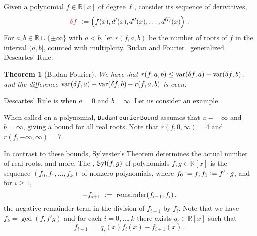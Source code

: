 \documentclass[12pt]{amsart}
\newtheorem{theorem}{Theorem}
\theoremstyle{definition}
\newcommand{\RR}{\mathbb{R}}
\DeclareMathOperator{\var}{{\rm var}}
\DeclareMathOperator{\Syl}{{\rm Syl}}
\newcommand{\defcolor}[1]{{\color{Maroon}#1}}
\newcommand{\demph}[1]{\defcolor{{\sl #1}}}
\begin{document}
Given a polynomial $f\in\RR[x]$ of degree $\ell$, consider its sequence of derivatives,
%
 \[
   \defcolor{\delta f}\ \vcentcolon= \left(f(x),d'(x),d''(x),\dots,d^{(l)}(x)\right)\,.
 \]
%
For $a,b\in \RR\cup\{\pm \infty\}$ with $a<b$, let \defcolor{$r(f,a,b)$} be the number of roots of $f$ in the interval $(a,b]$, counted
with multiplcity.
Budan and Fourier~\cite[Ch.\ 2]{So_Book} generalized Descartes' Rule.

\begin{theorem}[Budan-Fourier]
  We have that $r(f,a,b)\leq \var(\delta f,a) -\var(\delta f,b)$, and the difference
  $\var(\delta f,a) -\var(\delta f,b)-r(f,a,b)$ is even. 
\end{theorem}

Descartes' Rule is when $a=0$ and $b=\infty$.
Let us consider an example.
%
\begin{leftbar}

\end{leftbar}
%
When called on a polynomial, \texttt{BudanFourierBound} assumes that $a=-\infty$ and $b=\infty$, giving a bound for all real roots.
Note that $r(f,0,\infty)=4$ and $r(f,-\infty,\infty)=7$.

In contrast to these bounds, 
Sylvester's Theorem determines the actual number of real roots, and more.
The \demph{Sylvester sequence}, \defcolor{$\Syl(f,g)$} of polynomials $f,g\in\RR[x]$ is the sequence
$\left(f_0,f_1,\dotsc,f_k\right)$ of nonzero polynomials, where $f_0\vcentcolon= f, f_1 \vcentcolon= f'\cdot g$,
and for $i\geq 1$, 
%
  \[
    -f_{i+1}\ \vcentcolon=\ \mbox{remainder}(f_{i-1},f_i)\,,
  \]
%
the negative remainder term in the division of $f_{i-1}$ by $f_i$.
Note that we have $f_k = \gcd(f,f'g)$ and for each $i=0,\dotsc,k$ there exists $q_i\in\RR[x]$ such that
%
 \begin{equation}\label{Eq:divisionAlgorithm}
    f_{i-1}\ =\ q_i(x)f_i(x)-f_{i+1}(x)\,.
 \end{equation}



\end{document}

